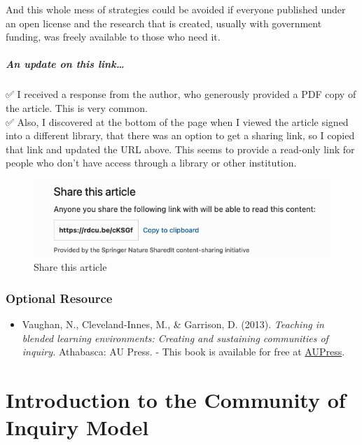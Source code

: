 \documentclass[
]{book}
\providecommand{\tightlist}{%
  \setlength{\itemsep}{0pt}\setlength{\parskip}{0pt}}
\begin{document}
\begin{protip}
And this whole mess of strategies could be avoided if everyone published
under an open license and the research that is created, usually with
government funding, was freely available to those who need it.

\hypertarget{an-update-on-this-link}{%
\subparagraph{An update on this
link\ldots{}}\label{an-update-on-this-link}}

✅ I received a response from the author, who generously provided a PDF
copy of the article. This is very common.\\
✅ Also, I discovered at the bottom of the page when I viewed the
article signed into a different library, that there was an option to get
a sharing link, so I copied that link and updated the URL above. This
seems to provide a read-only link for people who don't have access
through a library or other institution.
\end{protip}

\begin{figure}
\centering
\includegraphics{assets/u2/share.png}
\caption{Share this article}
\end{figure}

\hypertarget{optional-resource}{%
\subsubsection*{Optional Resource}\label{optional-resource}}

\begin{itemize}
\tightlist
\item
  Vaughan, N., Cleveland-Innes, M., \& Garrison, D. (2013). \emph{Teaching in blended learning environments: Creating and sustaining communities of inquiry.} Athabasca: AU Press. - This book is available for free at \href{http://www.aupress.ca/index.php/books/120229}{AUPress}.
\end{itemize}

\hypertarget{introduction-to-the-community-of-inquiry-model}{%
\section{Introduction to the Community of Inquiry Model}\label{introduction-to-the-community-of-inquiry-model}}
\end{document}
